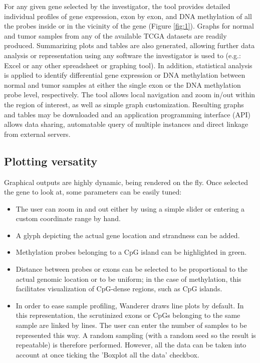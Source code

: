 \documentclass{bmcart}
\begin{document}
For any given gene selected by the investigator, the tool provides detailed individual profiles of gene expression, exon by exon, and DNA methylation of all the probes inside or in the vicinity of the gene (Figure \ref{fig:1}). Graphs for normal and tumor samples from any of the available TCGA datasets are readily produced. Summarizing plots and tables are also generated, allowing further data analysis or representation using any software the investigator is used to (e.g.: Excel or any other spreadsheet or graphing tool). In addition, statistical analysis is applied to identify differential gene expression or DNA methylation between normal and tumor samples at either the single exon or the DNA methylation probe level, respectively. The tool allows local navigation and zoom in/out within the region of interest, as well as simple graph customization. Resulting graphs and tables may be downloaded and an application programming interface (API) allows data sharing, automatable query of multiple instances and direct linkage from external servers.\\


 
\subsection*{Plotting versatity}

Graphical outputs are highly dynamic, being rendered on the fly. Once selected the gene to look at, some parameters can be easily tuned:
\begin{itemize}
\item The user can zoom in and out either by using a simple slider or entering a custom coordinate range by hand. 
\item A glyph depicting the actual gene location and strandness can be added. 
\item Methylation probes belonging to a CpG island can be highlighted in green. 
\item Distance between probes or exons can be selected to be proportional to the actual genomic location or to be uniform; in the case of methylation, this facilitates visualization of CpG-dense regions, such as CpG islands. 
\item In order to ease sample profiling, Wanderer draws line plots by default. In this representation, the scrutinized exons or CpGs belonging to the same sample are linked by lines. The user can enter the number of samples to be represented this way. A random sampling (with a random seed so the result is repeatable) is therefore performed. However, all the data can be taken into account at once ticking the 'Boxplot all the data' checkbox.

\end{itemize}
\end{document}
